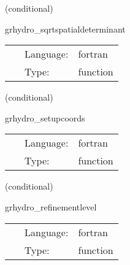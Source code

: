\vspace{5mm}

   (conditional) 

\hspace{5mm} grhydro\_sqrtspatialdeterminant 

\hspace{5mm}{\it calculate sdetg } 


\hspace{5mm}

 \begin{tabular*}{160mm}{cll} 
~ & Language:  & fortran \\ 
~ & Type:  & function \\ 
\end{tabular*} 


\vspace{5mm}

   (conditional) 

\hspace{5mm} grhydro\_setupcoords 

\hspace{5mm}{\it set up the coordinates for use with the comoving shift } 


\hspace{5mm}

 \begin{tabular*}{160mm}{cll} 
~ & Language:  & fortran \\ 
~ & Type:  & function \\ 
\end{tabular*} 


\vspace{5mm}

   (conditional) 

\hspace{5mm} grhydro\_refinementlevel 

\hspace{5mm}{\it calculate current refinement level (for the check of the c2p mask) } 


\hspace{5mm}

 \begin{tabular*}{160mm}{cll} 
~ & Language:  & fortran \\ 
~ & Type:  & function \\ 
\end{tabular*} 


\vspace{5mm}

